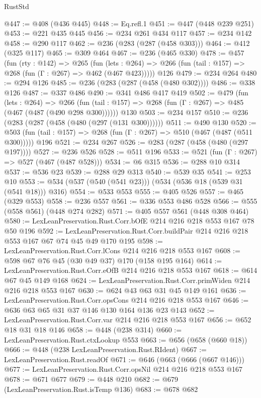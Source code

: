 \begin{lexlean}{RustStd}
\begin{coremodule}
@447 := @408 (@436 @445)
@448 := Eq.refl.{1}
@451 := @447 (@448 @239 @251)
@453 := @221 @435 @445
@456 := @234 @261 @434 @117
@457 := @234 @142
@458 := @290 @117
@462 := @236 (@283 (@287 (@458 @303)))
@464 := @412 (@325 @117)
@465 := @309 @464
@467 := @236 (@465 @330)
@478 := @457
    (fun (rty : @142) =>
    @265
      (fun (lets : @264) => @266 (fun (tail : @157) => @268 (fun (Γ : @267) => @462 (@467 @423)))))
    @126
@479 := @234 @264
@480 := @294 @126
@485 := @236 (@283 (@287 (@458 (@480 @302))))
@486 := @338 @126
@487 := @337 @486
@490 := @341 @486 @417 @419
@502 := @479
    (fun (lets : @264) =>
    @266 (fun (tail : @157) => @268 (fun (Γ : @267) => @485 (@467 (@487 (@490 @298 @300))))))
    @130
@503 := @234 @157
@510 := @236 (@283 (@287 (@458 (@480 (@297 (@131 @300))))))
@511 := @490 @130
@520 := @503 (fun (tail : @157) => @268 (fun (Γ : @267) => @510 (@467 (@487 (@511 @300))))) @196
@521 := @234 @267
@526 := @283 (@287 (@458 (@480 (@297 @197))))
@527 := @236 @526
@528 := @511 @196
@533 := @521 (fun (Γ : @267) => @527 (@467 (@487 @528)))
@534 := @6 @315
@536 := @288 @10 @314
@537 := @536 @23
@539 := @288 @29 @313
@540 := @539 @35
@541 := @253 @10
@553 := @534 (@537 (@540 (@541 @23))) (@534 (@536 @18 (@539 @31 (@541 @18))) @316)
@554 := @533 @553
@555 := @405 @526
@557 := @465 (@329 @553)
@558 := @236 @557
@561 := @336 @553 @486 @528
@566 := @555 (@558 @561) (@448 @274 @282)
@571 := @405 @557 @561 (@448 @308 @464)
@580 := LexLeanPreservation.Rust.Corr.bOfE @214 @216 @218 @553 @167 @78 @50 @196
@592 := LexLeanPreservation.Rust.Corr.buildPair @214 @216 @218 @553 @167 @67 @74 @45 @49 @170 @195
@598 := LexLeanPreservation.Rust.Corr.lCons @214 @216 @218 @553 @167
@608 := @598 @67 @76 @45 (@30 @49 @37) @170 (@158 @195 @164)
@614 := LexLeanPreservation.Rust.Corr.eOfB @214 @216 @218 @553 @167
@618 := @614 @67 @45 @149 @168
@624 := LexLeanPreservation.Rust.Corr.primWiden @214 @216 @218 @553 @167
@630 := @624 @43 @63 @31 @45 @149 @161
@636 := LexLeanPreservation.Rust.Corr.opsCons @214 @216 @218 @553 @167
@646 := @636 @63 @65 @31 @37 @146 @130 @164 @136 @23 @143
@652 := LexLeanPreservation.Rust.Corr.var @214 @216 @218 @553 @167
@656 := @652 @18 @31 @18 @146
@658 := @448 (@238 @314)
@660 := LexLeanPreservation.Rust.ctxLookup @553
@663 := @656 (@658 (@660 @18))
@666 := @448 (@238 LexLeanPreservation.Rust.RIdent)
@667 := LexLeanPreservation.Rust.readOf
@671 := @646 (@663 (@666 (@667 @146)))
@677 := LexLeanPreservation.Rust.Corr.opsNil @214 @216 @218 @553 @167
@678 := @671 @677
@679 := @448 @210
@682 := @679 (LexLeanPreservation.Rust.isTemp @136)
@683 := @678 @682

\end{coremodule}
\end{lexlean}
